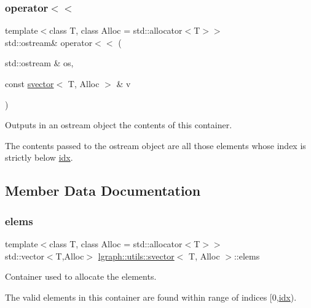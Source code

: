 \subsubsection{\texorpdfstring{operator$<$$<$}{operator<<}}
{\footnotesize\ttfamily template$<$class T, class Alloc = std\+::allocator$<$\+T$>$$>$ \\
std\+::ostream\& operator$<$$<$ (\begin{DoxyParamCaption}\item[{std\+::ostream \&}]{os,  }\item[{const \hyperlink{classlgraph_1_1utils_1_1svector}{svector}$<$ T, Alloc $>$ \&}]{v }\end{DoxyParamCaption})\hspace{0.3cm}{\ttfamily [friend]}}



Outputs in an ostream object the contents of this container. 

The contents passed to the ostream object are all those elements whose index is strictly below \hyperlink{classlgraph_1_1utils_1_1svector_a7ef963c079c7dc8a6a559ceef81a241f}{idx}. 

\subsection{Member Data Documentation}
\mbox{\label{classlgraph_1_1utils_1_1svector_aa72e9ffeb58f88d3cb01671e3e672a45}} 
\subsubsection{\texorpdfstring{elems}{elems}}
{\footnotesize\ttfamily template$<$class T, class Alloc = std\+::allocator$<$\+T$>$$>$ \\
std\+::vector$<$T,Alloc$>$ \hyperlink{classlgraph_1_1utils_1_1svector}{lgraph\+::utils\+::svector}$<$ T, Alloc $>$\+::elems\hspace{0.3cm}{\ttfamily [private]}}



Container used to allocate the elements. 

The valid elements in this container are found within range of indices \mbox{[}0,\hyperlink{classlgraph_1_1utils_1_1svector_a7ef963c079c7dc8a6a559ceef81a241f}{idx}).

